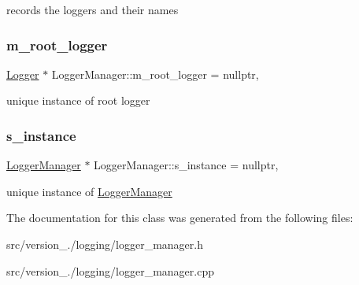 records the loggers and their names \mbox{\label{classez_1_1logging_1_1LoggerManager_ac4e86e0e638673338ccb8d652446be92}} 
\subsubsection{\texorpdfstring{m\+\_\+root\+\_\+logger}{m\_root\_logger}}
{\footnotesize\ttfamily \hyperlink{classez_1_1logging_1_1Logger}{Logger} $\ast$ Logger\+Manager\+::m\+\_\+root\+\_\+logger = nullptr\hspace{0.3cm}{\ttfamily [static]}, {\ttfamily [protected]}}

unique instance of root logger \mbox{\label{classez_1_1logging_1_1LoggerManager_a635ac579d7e6e68fb248566e34d8485d}} 
\subsubsection{\texorpdfstring{s\+\_\+instance}{s\_instance}}
{\footnotesize\ttfamily \hyperlink{classez_1_1logging_1_1LoggerManager}{Logger\+Manager} $\ast$ Logger\+Manager\+::s\+\_\+instance = nullptr\hspace{0.3cm}{\ttfamily [static]}, {\ttfamily [protected]}}

unique instance of \hyperlink{classez_1_1logging_1_1LoggerManager}{Logger\+Manager} 

The documentation for this class was generated from the following files\+:\begin{DoxyCompactItemize}
\item 
src/version\+\_./logging/logger\+\_\+manager.\+h\item 
src/version\+\_./logging/logger\+\_\+manager.\+cpp\end{DoxyCompactItemize}
